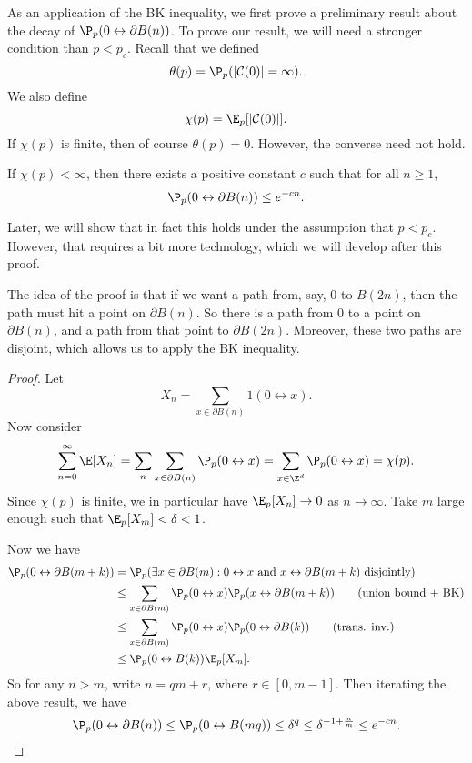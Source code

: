 \documentclass[a4paper]{article}
\begin{document}
As an application of the BK inequality, we first prove a preliminary result about the decay of $\P_p(0 \leftrightarrow \partial B(n))$. To prove our result, we will need a stronger condition than $p < p_c$. Recall that we defined
\[
  \theta(p) = \P_p( |\mathcal{C}(0)| = \infty).
\]
We also define
\[
  \chi(p) = \E_p[|\mathcal{C}(0)|].
\]
If $\chi(p)$ is finite, then of course $\theta(p) = 0$. However, the converse need not hold.

\begin{thm}
  If $\chi(p) < \infty$, then there exists a positive constant $c$ such that for all $n \geq 1$,
  \[
    \P_p(0 \leftrightarrow \partial B(n)) \leq e^{-cn}.
  \]
\end{thm}
Later, we will show that in fact this holds under the assumption that $p < p_c$. However, that requires a bit more technology, which we will develop after this proof.

The idea of the proof is that if we want a path from, say, $0$ to $B(2n)$, then the path must hit a point on $\partial B(n)$. So there is a path from $0$ to a point on $\partial B(n)$, and a path from that point to $\partial B(2n)$. Moreover, these two paths are disjoint, which allows us to apply the BK inequality.
\begin{proof}
  Let
  \[
    X_n = \sum_{x \in \partial B(n)} 1(0 \leftrightarrow x).
  \]
  Now consider
  \[
    \sum_{n = 0}^\infty \E[X_n] = \sum_n \sum_{x \in \partial B(n)} \P_p(0 \leftrightarrow x) = \sum_{x \in \Z^d} \P_p(0 \leftrightarrow x) = \chi(p).
  \]
  Since $\chi(p)$ is finite, we in particular have $\E_p[X_n] \to 0$ as $n \to \infty$. Take $m$ large enough such that $\E_p[X_m] < \delta < 1$.

  Now we have
  \begin{align*}
    \P_p( 0 \leftrightarrow \partial B(m + k)) &= \P_p(\exists x \in \partial B(m) : 0 \leftrightarrow x \text{ and } x \leftrightarrow \partial B(m + k)\text{ disjointly})\\
    &\leq \sum_{x \in \partial B(m)} \P_p(0 \leftrightarrow x) \P_p(x \leftrightarrow \partial B(m + k)) \tag{union bound + BK}\\
    &\leq \sum_{x \in \partial B(m)} \P_p(0 \leftrightarrow x) \P_p(0 \leftrightarrow \partial B(k)) \tag{trans. inv.}\\
    &\leq \P_p(0 \leftrightarrow B(k)) \E_p[X_m].
  \end{align*}
  So for any $n > m$, write $n = qm + r$, where $r \in [0, m - 1]$. Then iterating the above result, we have
  \[
    \P_p(0 \leftrightarrow \partial B(n)) \leq \P_p(0 \leftrightarrow B(mq)) \leq \delta^q \leq \delta^{-1 + \frac{n}{m}} \leq e^{-cn}.
  \]
\end{proof}
\end{document}
